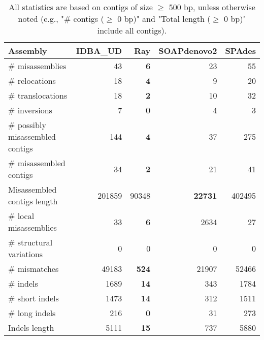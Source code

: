 \documentclass[12pt,a4paper]{article}
\begin{document}
\begin{table}[ht]
\begin{center}
\caption{All statistics are based on contigs of size $\geq$ 500 bp, unless otherwise noted (e.g., "\# contigs ($\geq$ 0 bp)" and "Total length ($\geq$ 0 bp)" include all contigs).}
\begin{tabular}{|l*{4}{|r}|}
\hline
Assembly & IDBA\_UD & Ray & SOAPdenovo2 & SPAdes \\ \hline
\# misassemblies & 43 & {\bf 6} & 23 & 55 \\ \hline
\hspace{5mm}\# relocations & 18 & {\bf 4} & 9 & 20 \\ \hline
\hspace{5mm}\# translocations & 18 & {\bf 2} & 10 & 32 \\ \hline
\hspace{5mm}\# inversions & 7 & {\bf 0} & 4 & 3 \\ \hline
\# possibly misassembled contigs & 144 & {\bf 4} & 37 & 275 \\ \hline
\# misassembled contigs & 34 & {\bf 2} & 21 & 41 \\ \hline
Misassembled contigs length & 201859 & 90348 & {\bf 22731} & 402495 \\ \hline
\# local misassemblies & 33 & {\bf 6} & 2634 & 27 \\ \hline
\# structural variations & 0 & 0 & 0 & 0 \\ \hline
\# mismatches & 49183 & {\bf 524} & 21907 & 52466 \\ \hline
\# indels & 1689 & {\bf 14} & 343 & 1784 \\ \hline
\hspace{5mm}\# short indels & 1473 & {\bf 14} & 312 & 1511 \\ \hline
\hspace{5mm}\# long indels & 216 & {\bf 0} & 31 & 273 \\ \hline
Indels length & 5111 & {\bf 15} & 737 & 5880 \\ \hline
\end{tabular}
\end{center}
\end{table}
\end{document}
